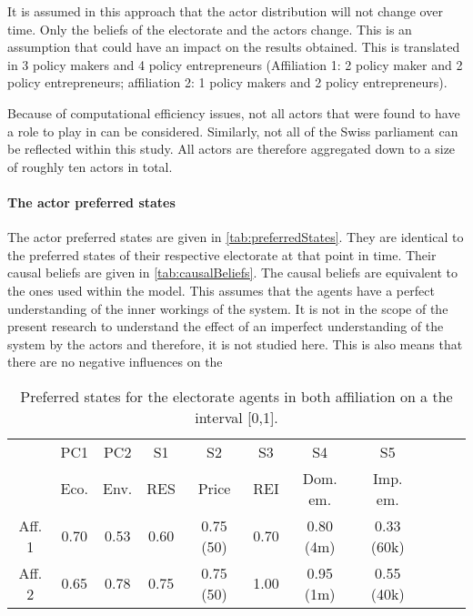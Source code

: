 \documentclass[12pt]{article}
\begin{document}
It is assumed in this approach that the actor distribution will not change over time. Only the beliefs of the electorate and the actors change. This is an assumption that could have an impact on the results obtained. This is translated in 3 policy makers and 4 policy entrepreneurs (Affiliation 1: 2 policy maker and 2 policy entrepreneurs; affiliation 2: 1 policy makers and 2 policy entrepreneurs).

Because of computational efficiency issues, not all actors that were found to have a role to play in \cite{markard2016socio} can be considered. Similarly, not all of the Swiss parliament can be reflected within this study. All actors are therefore aggregated down to a size of roughly ten actors in total. 

\paragraph{The actor preferred states} The actor preferred states are given in \autoref{tab:preferredStates}. They are identical to the preferred states of their respective electorate at that point in time. Their causal beliefs are given in \autoref{tab:causalBeliefs}. The causal beliefs are equivalent to the ones used within the model. This assumes that the agents have a perfect understanding of the inner workings of the system. It is not in the scope of the present research to understand the effect of an imperfect understanding of the system by the actors and therefore, it is not studied here. This is also means that there are no negative influences on the 

\begin{table}
\begin{center}
\begin{tabular}{ |c|c|c|c|c|c|c|c|c|c|c| } 
\hline
		
		& PC1 	& PC2	& S1		& S2			& S3		& S4			& S5		\\ 
		& Eco.	& Env.	& RES	& Price		& REI	& Dom. em.	& Imp. em.	\\ \hline \hline
Aff. 1		& 0.70	& 0.53	& 0.60	& 0.75 (50)	& 0.70	& 0.80 (4m)	& 0.33 (60k)	\\ \hline
Aff. 2		& 0.65	& 0.78	& 0.75	& 0.75 (50) 	& 1.00	& 0.95 (1m)	& 0.55 (40k)	\\ 
\hline
\end{tabular}
\end{center}
\caption{Preferred states for the electorate agents in both affiliation on a the interval [0,1].}
\label{tab:preferredStates}
\end{table}
\end{document}
